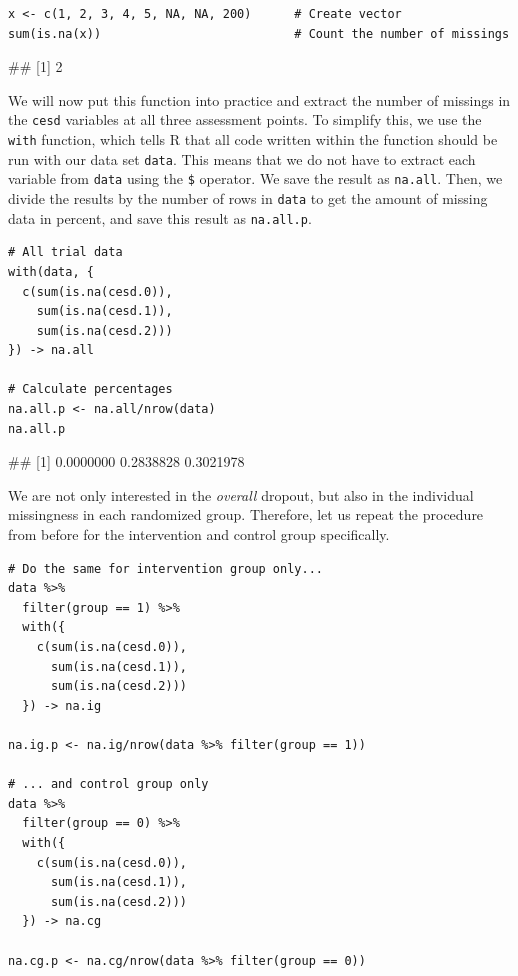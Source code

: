 \begin{lstlisting}  
x <- c(1, 2, 3, 4, 5, NA, NA, 200)      # Create vector
sum(is.na(x))                           # Count the number of missings
\end{lstlisting}

\begin{example}
## [1] 2
\end{example}

We will now put this function into practice and extract the number of missings in the \texttt{cesd} variables at all three assessment points. To simplify this, we use the \texttt{with} function, which tells \textsf{R} that all code written within the function should be run with our data set \texttt{data}. This means that we do not have to extract each variable from \texttt{data} using the \texttt{\$} operator. We save the result as \texttt{na.all}. Then, we divide the results by the number of rows in \texttt{data} to get the amount of missing data in percent, and save this result as \texttt{na.all.p}.

\begin{lstlisting}
# All trial data
with(data, {
  c(sum(is.na(cesd.0)),
    sum(is.na(cesd.1)),
    sum(is.na(cesd.2)))
}) -> na.all

# Calculate percentages
na.all.p <- na.all/nrow(data)
na.all.p
\end{lstlisting}
\begin{example}
## [1] 0.0000000 0.2838828 0.3021978
\end{example}

We are not only interested in the \emph{overall} dropout, but also in the individual missingness in each randomized group. Therefore, let us repeat the procedure from before for the intervention and control group specifically.

\begin{lstlisting}
# Do the same for intervention group only...
data %>%
  filter(group == 1) %>%
  with({
    c(sum(is.na(cesd.0)),
      sum(is.na(cesd.1)),
      sum(is.na(cesd.2)))
  }) -> na.ig

na.ig.p <- na.ig/nrow(data %>% filter(group == 1))

# ... and control group only
data %>%
  filter(group == 0) %>%
  with({
    c(sum(is.na(cesd.0)),
      sum(is.na(cesd.1)),
      sum(is.na(cesd.2)))
  }) -> na.cg

na.cg.p <- na.cg/nrow(data %>% filter(group == 0))
\end{lstlisting}

